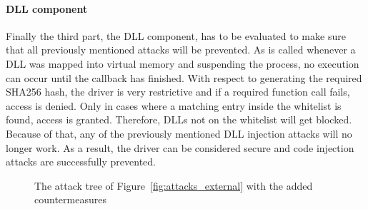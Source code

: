 \paragraph{\gls{DLL} component}
Finally the third part, the \gls{DLL} component, has to be evaluated to make sure that all previously mentioned attacks will be prevented. As  is called whenever a \gls{DLL} was mapped into virtual memory and suspending the process, no execution can occur until the callback has finished. With respect to generating the required SHA256 hash, the driver is very restrictive and if a required function call fails, access is denied. Only in cases where a matching entry inside the whitelist is found, access is granted. Therefore, \glspl{DLL} not on the whitelist will get blocked. Because of that, any of the previously mentioned \gls{DLL} injection attacks will no longer work. As a result, the driver can be considered secure and code injection attacks are successfully prevented.
\pagestyle{empty}
\begin{figure}[h] 
 \centering
\caption{The attack tree of Figure~\ref{fig:attacks_external} with the added countermeasures}
\label{fig:attacks_external_def}
\end{figure}
\restoregeometry
\pagestyle{plain}